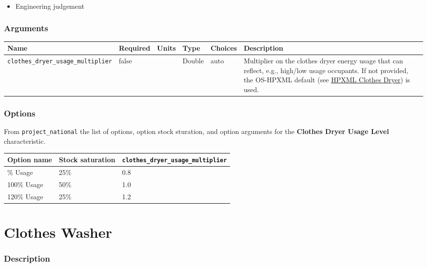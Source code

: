 \begin{itemize}
 
\item
  Engineering judgement
\end{itemize}

\subsubsection{Arguments}\label{arguments-7}

\begin{longtable}[]{@{}llllll@{}}
\toprule\noalign{}
Name & Required & Units & Type & Choices & Description \\
\midrule\noalign{}
\endhead
\bottomrule\noalign{}
\endlastfoot
\texttt{clothes\_dryer\_usage\_multiplier} & false & & Double & auto &
Multiplier on the clothes dryer energy usage that can reflect, e.g.,
high/low usage occupants. If not provided, the OS-HPXML default (see
\href{https://openstudio-hpxml.readthedocs.io/en/v1.7.0/workflow_inputs.html\#hpxml-clothes-dryer}{HPXML
Clothes Dryer}) is used. \\
\end{longtable}

\subsubsection{Options}\label{options-16}

From \texttt{project\_national} the list of options, option stock
sturation, and option arguments for the \textbf{Clothes Dryer Usage
Level} characteristic.

\begin{longtable}[]{@{}lll@{}}
\toprule\noalign{}
Option name & Stock saturation &
\texttt{clothes\_dryer\_usage\_multiplier} \\
\midrule\noalign{}
\endhead
\bottomrule\noalign{}
\endlastfoot
80\% Usage & 25\% & 0.8 \\
100\% Usage & 50\% & 1.0 \\
120\% Usage & 25\% & 1.2 \\
\end{longtable}

\section{Clothes Washer}\label{clothes_washer}

\subsubsection{Description}\label{description-17}

